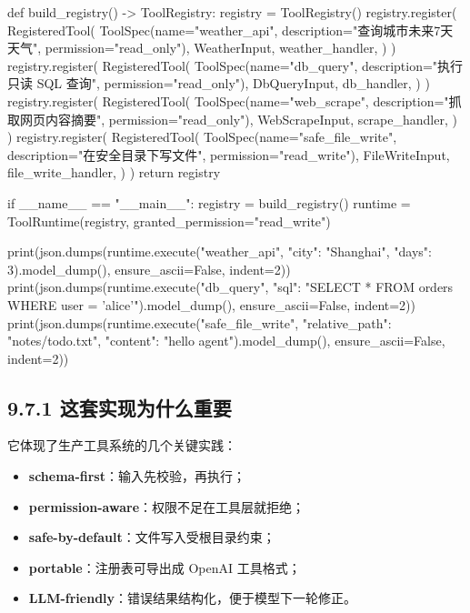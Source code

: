 \begin{codeblock}
def build_registry() -> ToolRegistry:
    registry = ToolRegistry()
    registry.register(
        RegisteredTool(
            ToolSpec(name="weather_api", description="查询城市未来7天天气", permission="read_only"),
            WeatherInput,
            weather_handler,
        )
    )
    registry.register(
        RegisteredTool(
            ToolSpec(name="db_query", description="执行只读 SQL 查询", permission="read_only"),
            DbQueryInput,
            db_handler,
        )
    )
    registry.register(
        RegisteredTool(
            ToolSpec(name="web_scrape", description="抓取网页内容摘要", permission="read_only"),
            WebScrapeInput,
            scrape_handler,
        )
    )
    registry.register(
        RegisteredTool(
            ToolSpec(name="safe_file_write", description="在安全目录下写文件", permission="read_write"),
            FileWriteInput,
            file_write_handler,
        )
    )
    return registry


if __name__ == "__main__":
    registry = build_registry()
    runtime = ToolRuntime(registry, granted_permission="read_write")

    print(json.dumps(runtime.execute("weather_api", {"city": "Shanghai", "days": 3}).model_dump(), ensure_ascii=False, indent=2))
    print(json.dumps(runtime.execute("db_query", {"sql": "SELECT * FROM orders WHERE user = 'alice'"}).model_dump(), ensure_ascii=False, indent=2))
    print(json.dumps(runtime.execute("safe_file_write", {"relative_path": "notes/todo.txt", "content": "hello agent"}).model_dump(), ensure_ascii=False, indent=2))
\end{codeblock}

\subsection{9.7.1 这套实现为什么重要}

它体现了生产工具系统的几个关键实践：


\begin{itemize}[leftmargin=2em]
\item \textbf{schema-first}：输入先校验，再执行；
\item \textbf{permission-aware}：权限不足在工具层就拒绝；
\item \textbf{safe-by-default}：文件写入受根目录约束；
\item \textbf{portable}：注册表可导出成 OpenAI 工具格式；
\item \textbf{LLM-friendly}：错误结果结构化，便于模型下一轮修正。
\end{itemize}

